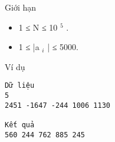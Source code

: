 Giới hạn
\begin{itemize}
	\item     1 ≤ N ≤ 10    $^     5    $    .   
	\item     1 ≤ |a    $_     i    $    | ≤ 5000.   
\end{itemize}
Ví dụ
\begin{verbatim}
Dữ liệu
5
2451 -1647 -244 1006 1130

Kết quả
560 244 762 885 245	
\end{verbatim}